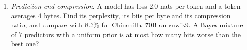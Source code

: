 \begin{exercise}[Problems]
\begin{enumerate}
  \item \emph{Prediction and compression.} A model has loss $2.0$ nats per token and a token averages $4$ bytes. Find its perplexity, its bits per byte and its compression ratio, and compare with $8.3\%$ for Chinchilla~70B on enwik9. A Bayes mixture of $7$ predictors with a uniform prior is at most how many bits worse than the best one?
\end{enumerate}
\end{exercise}

